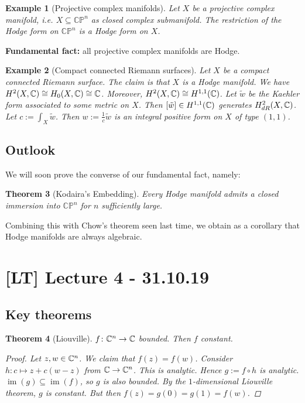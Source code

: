 \documentclass[A4paper, british, reqno]{amsart}
\theoremstyle{darkgreentheorem}
\newtheorem{thm}{Theorem}[section]
\theoremstyle{darkbluedefinition}
\theoremstyle{darkredexample}
\newtheorem{exa}[thm]{Example}
\theoremstyle{remark}
\DeclareMathOperator{\im}{im}
\newcommand{\CP}{\mathbb{CP}}
\newcommand{\1}{\mathbbm{1}}
\begin{document}
\begin{exa}[Projective complex manifolds]
    Let $X$ be a projective complex manifold, i.e. $X\subseteq \CP^{n}$ as closed complex submanifold.
    The restriction of the Hodge form on $\CP^{n}$ is a Hodge form on $X$.
\end{exa}

\textbf{Fundamental fact:} all projective complex manifolds are Hodge.

\begin{exa}[Compact connected Riemann surfaces]
    Let $X$ be a compact connected Riemann surface.
    The claim is that $X$ is a Hodge manifold.
    We have $H^{2}(X,\mathbb{C})\cong H_{0}(X,\mathbb{C})\cong \mathbb{C}$.
    Moreover, $H^{2}(X,\mathbb{C})\cong H^{1,1}(\mathbb{C})$.
    Let $\tilde{w}$ be the Kaehler form associated to some metric on $X$.
    Then $[\tilde{w}]\in H^{1,1}(\mathbb{C})$ generates $H_{dR}^{2}(X,\mathbb{C})$.
    Let $c:=\int_{X}\tilde{w}$.
    Then $w:=\frac{1}{c}\tilde{w}$ is an integral positive form on $X$ of type $(1,1)$.
\end{exa}

\subsection{Outlook}

We will soon prove the converse of our fundamental fact, namely:

\begin{thm}[Kodaira's Embedding]
    Every Hodge manifold admits a closed immersion into $\CP^{n}$ for $n$ sufficiently large.
\end{thm}

Combining this with Chow's theorem seen last time, we obtain as a corollary that Hodge manifolds are always algebraic.

\section{[LT] Lecture 4 - 31.10.19}

\subsection{Key theorems}

\begin{thm}[Liouville]
    $f\colon \mathbb{C}^{n}\to \mathbb{C}$ bounded.
    Then $f$ constant.
    \begin{proof}
	Let $z,w\in \mathbb{C}^{n}$.
	We claim that $f(z)=f(w)$.
	Consider $h\colon c\mapsto z+c(w-z)$ from $\mathbb{C}\to \mathbb{C}^{n}$.
	This is analytic.
	Hence $g:=f\circ h$ is analytic.
	$\im(g)\subseteq \im(f)$, so $g$ is also bounded.
	By the $1$-dimensional Liouville theorem, $g$ is constant.
	But then $f(z)=g(0)=g(1)=f(w)$.
    \end{proof}
\end{thm}
\end{document}
